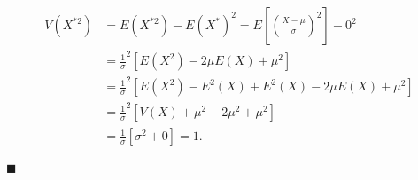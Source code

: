 \documentclass{article}
\begin{document}
  \begin{eqnarray}
\label{eq22}
\begin{split}
V(X^{*2}) &= E(X^{*2}) - E(X^*)^2 = E\left[\left(\frac{X - \mu}{\sigma}\right)^2\right] - 0^2 \\
& = \frac{1}{\sigma}^2 [E(X^{2}) - 2 \mu E(X) + \mu^2] \\
&= \frac{1}{\sigma}^2 [E(X^{2}) - E^2(X) + E^2(X) - 2\mu E(X) + \mu^2]\\
& = \frac{1}{\sigma}^2[V(X) + \mu^2 - 2\mu^2 + \mu^2]\\
& = \frac{1}{\sigma}[\sigma^2 + 0] = 1.
\end{split}
\end{eqnarray}


\begin{flushright}
$\blacksquare$
\end{flushright}






 
\end{document}
